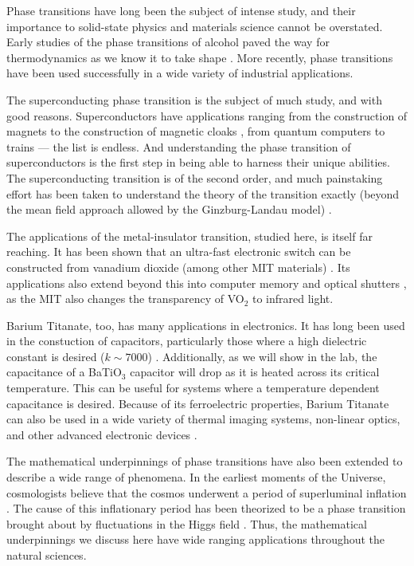 \documentclass[%
 reprint,
 amsmath,amssymb,
 aps,
 pra,
]{revtex4-1}
\begin{document}
Phase transitions have long been the subject of intense study, and their importance to solid-state physics and materials science cannot be overstated. Early studies of the phase transitions of alcohol paved the way for thermodynamics as we know it to take shape \cite{phase_history}. More recently, phase transitions have been used successfully in a wide variety of industrial applications.

The superconducting phase transition is the subject of much study, and with good reasons. Superconductors have applications ranging from the construction of magnets \cite{magnets} to the construction of magnetic cloaks \cite{rapheal}, from quantum computers \cite{quantum_super, quantum_super2} to trains \cite{trains} --- the list is endless. And understanding the phase transition of superconductors is the first step in being able to harness their unique abilities. The superconducting transition is of the second order, and much painstaking effort has been taken to understand the theory of the transition exactly (beyond the mean field approach allowed by the Ginzburg-Landau model) \cite{superconductor, supercond2, supercond3}.

The applications of the metal-insulator transition, studied here, is itself far reaching. It has been shown that an ultra-fast electronic switch can be constructed from vanadium dioxide (among other MIT materials) \cite{switching}. Its applications also extend beyond this into computer memory and optical shutters \cite{memory}, as the MIT also changes the transparency of VO$_2$ to infrared light.

Barium Titanate, too, has many applications in electronics. It has long been used in the constuction of capacitors, particularly those where a high dielectric constant is desired ($k \sim 7000$) \cite{capacitors}. Additionally, as we will show in the lab, the capacitance of a BaTiO$_3$ capacitor will drop as it is heated across its critical temperature. This can be useful for systems where a temperature dependent capacitance is desired. Because of its ferroelectric properties, Barium Titanate can also be used in a wide variety of thermal imaging systems, non-linear optics, and other advanced electronic devices \cite{thermals}.

The mathematical underpinnings of phase transitions have also been extended to describe a wide range of phenomena. In the earliest moments of the Universe, cosmologists believe that the cosmos underwent a period of superluminal inflation \cite{cosmo}. The cause of this inflationary period has been theorized to be a phase transition brought about by fluctuations in the Higgs field \cite{cosmo2, cosmo3, cosmo4, cosmo5}. Thus, the mathematical underpinnings we discuss here have wide ranging applications throughout the natural sciences.
\end{document}
